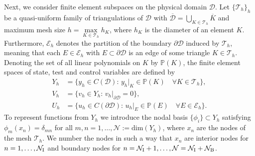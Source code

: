 \documentclass[a4paper,10pt]{article}
\newcommand{\cD}{{\mathcal{D}}}
\newcommand{\N}{{\mathcal{N}}}
\newcommand{\sbigotimes}{%
  \mathop{\mathchoice{\textstyle\bigotimes}{\bigotimes}{\bigotimes}{\bigotimes}}%
}
\numberwithin{theorem}{section}
\begin{document}


Next, we consider finite element subspaces on the physical domain $\mathcal{D}$. Let  $\{ \mathcal{T}_h\}_h$ be a quasi-uniform family of triangulations of $\mathcal{D}$  with $\overline{\mathcal{D}} = \bigcup_{K \in \mathcal{T}_h} \overline{K}$ and maximum mesh size $h=\max \limits_{K \in \mathcal{T}_h} h_{K}$, where $h_{K}$ is the diameter of an element $K$.  Furthermore, $\mathcal{E}_h$ denotes the partition of the boundary $\partial\mathcal D$ induced by $\mathcal T_h$, meaning that each $E\in \mathcal E_h$ with $E\subset\partial\mathcal D$ is an edge of some triangle $ K \in \mathcal T_h$. Denoting the set of  all linear polynomials on $K$ by $\mathbb{P}(K)$,  the finite element spaces of state, test and control variables are defined by
\begin{align*}
  Y_h  &= \{y_h \in C(\mathcal{D}) : \,  y_h|_K\in \mathbb{P}(K) \quad \forall K \in \mathcal{T}_h\},
  \\
  V_h  &= \{v_h \in Y_h : \,  v_h|_{\partial \cD} = 0\}, \\%
  U_h  &= \{u_h \in C(\partial\mathcal{D}) : \,  u_h|_E\in \mathbb{P}(E) \quad \forall E \in \mathcal{E}_h\}.
\end{align*}
To represent functions from $Y_h$ we introduce the nodal basis $\{\phi_i\}\subset Y_h$ satisfying  $\phi_m(x_n)=\delta_{mn}$ for all $m,n=1,\ldots,\N:=\text{dim}(Y_h)$, where $x_n$ are the nodes of the mesh $\mathcal{T}_h$. We number the nodes in such a way that $x_n$ are interior nodes for $n=1,\ldots,\N_{\textup{I}}$ and boundary nodes for $n=\N_{\textup{I}}+1,\ldots,\N=\N_{\textup{I}}+\N_{\textup{B}}$. 
\end{document}
